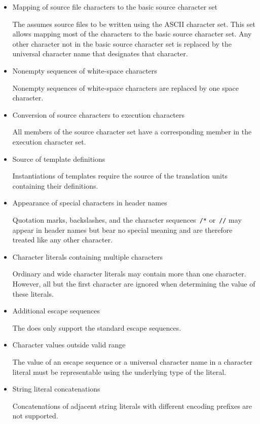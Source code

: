 \begin{itemize}

\item Mapping of source file characters to the basic source character set 

The \ecs{} assumes source files to be written using the ASCII character set.
This set allows mapping most of the characters to the basic source character set.
Any other character not in the basic source character set is replaced by the universal character name that designates that character.

\item Nonempty sequences of white-space characters 

Nonempty sequences of white-space characters are replaced by one space character.

\item Conversion of source characters to execution characters 

All members of the source character set have a corresponding member in the execution character set.

\item Source of template definitions 

Instantiations of templates require the source of the translation units containing their definitions.

\item Appearance of special characters in header names 

Quotation marks, backslashes, and the character sequences~\texttt{/*} or~\texttt{//} may appear in header names but bear no special meaning and are therefore treated like any other character.

\item Character literals containing multiple characters 

Ordinary and wide character literals may contain more than one character.
However, all but the first character are ignored when determining the value of these literals.

\item Additional escape sequences 

The \ecs{} does only support the standard escape sequences.

\item Character values outside valid range 

The value of an escape sequence or a universal character name in a character literal must be representable using the underlying type of the literal.

\item String literal concatenations 

Concatenations of adjacent string literals with different encoding prefixes are not supported.

\end{itemize}

